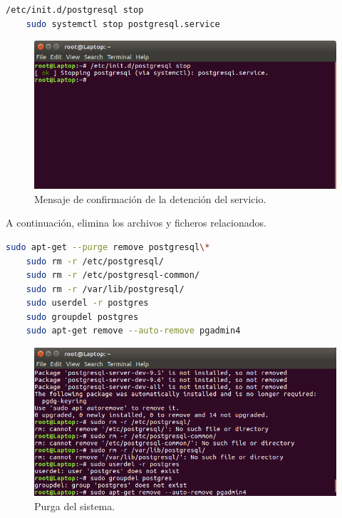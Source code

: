 \begin{lstlisting}[language=bash]
    /etc/init.d/postgresql stop
    sudo systemctl stop postgresql.service
\end{lstlisting}

\begin{figure}[H]
	\begin{center}
		\includegraphics[scale=0.35]{images/INST/2.png}
		\caption{Mensaje de confirmación de la detención del servicio.}
	\end{center}
\end{figure}

\bigbreak
A continuación, elimina los archivos y ficheros relacionados.

\begin{lstlisting}[language=bash]
    sudo apt-get --purge remove postgresql\*
    sudo rm -r /etc/postgresql/
    sudo rm -r /etc/postgresql-common/
    sudo rm -r /var/lib/postgresql/
    sudo userdel -r postgres
    sudo groupdel postgres
    sudo apt-get remove --auto-remove pgadmin4
\end{lstlisting}

\begin{figure}[H]
	\begin{center}
		\includegraphics[scale=0.35]{images/INST/3.png}
		\caption{Purga del sistema.}
	\end{center}
\end{figure}

